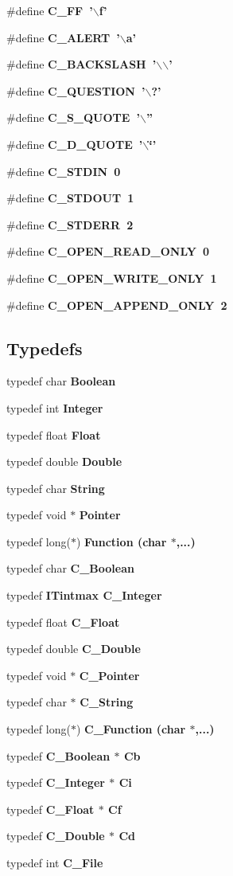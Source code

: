 \begin{CompactItemize}
\#define \bf{C\_\-FF}~'$\backslash$f'
\item 
\#define \bf{C\_\-ALERT}~'$\backslash$a'
\item 
\#define \bf{C\_\-BACKSLASH}~'$\backslash$$\backslash$'
\item 
\#define \bf{C\_\-QUESTION}~'$\backslash$?'
\item 
\#define \bf{C\_\-S\_\-QUOTE}~'$\backslash$''
\item 
\#define \bf{C\_\-D\_\-QUOTE}~'$\backslash$\char`\"{}'
\item 
\#define \bf{C\_\-STDIN}~0
\item 
\#define \bf{C\_\-STDOUT}~1
\item 
\#define \bf{C\_\-STDERR}~2
\item 
\#define \bf{C\_\-OPEN\_\-READ\_\-ONLY}~0
\item 
\#define \bf{C\_\-OPEN\_\-WRITE\_\-ONLY}~1
\item 
\#define \bf{C\_\-OPEN\_\-APPEND\_\-ONLY}~2
\end{CompactItemize}
\subsection*{Typedefs}
\begin{CompactItemize}
\item 
typedef char \bf{Boolean}
\item 
typedef int \bf{Integer}
\item 
typedef float \bf{Float}
\item 
typedef double \bf{Double}
\item 
typedef char \bf{String}
\item 
typedef void $\ast$ \bf{Pointer}
\item 
typedef long($\ast$) \bf{Function} (char $\ast$,...)
\item 
typedef char \bf{C\_\-Boolean}
\item 
typedef \bf{ITintmax} \bf{C\_\-Integer}
\item 
typedef float \bf{C\_\-Float}
\item 
typedef double \bf{C\_\-Double}
\item 
typedef void $\ast$ \bf{C\_\-Pointer}
\item 
typedef char $\ast$ \bf{C\_\-String}
\item 
typedef long($\ast$) \bf{C\_\-Function} (char $\ast$,...)
\item 
typedef \bf{C\_\-Boolean} $\ast$ \bf{Cb}
\item 
typedef \bf{C\_\-Integer} $\ast$ \bf{Ci}
\item 
typedef \bf{C\_\-Float} $\ast$ \bf{Cf}
\item 
typedef \bf{C\_\-Double} $\ast$ \bf{Cd}
\item 
typedef int \bf{C\_\-File}
\end{CompactItemize}
